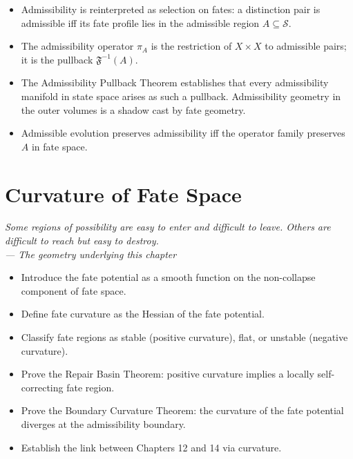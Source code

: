 \documentclass[12pt,twoside,openright]{book}
\newcommand{\distPairs}{X\times X}
\newcommand{\fateMap}{\mathfrak{F}}
\newcommand{\fateSpace}{\mathcal{S}}
\newcommand{\admRegion}{A}
\newcommand{\admOp}{\pi_{\!\admRegion}}
\newenvironment{epigraph}[2]{%
  \vspace{1em}\begin{flushright}
  \begin{minipage}{0.72\textwidth}
  \itshape\small #1\\[0.4em]
  \upshape\footnotesize\sffamily\color{DistGray}--- #2
  \end{minipage}\end{flushright}\vspace{1.5em}}{}
\newenvironment{objectives}{%
  \begin{tcolorbox}[colback=DistBlue!5,colframe=DistBlue,
    title={\faCheckCircle\enspace Chapter Objectives},
    fonttitle=\sffamily\bfseries\color{white},
    attach boxed title to top left={yshift=-2mm,xshift=4mm},
    boxed title style={colback=DistBlue},breakable]
  \begin{itemize}[leftmargin=*,nosep]}{%
  \end{itemize}\end{tcolorbox}\vspace{1em}}
\newenvironment{chapsummary}{%
  \begin{tcolorbox}[colback=DistBlue!5,colframe=DistBlue,
    title={\faBookOpen\enspace Summary},
    fonttitle=\sffamily\bfseries\color{white},
    attach boxed title to top left={yshift=-2mm,xshift=4mm},
    boxed title style={colback=DistBlue,rounded corners}]
  \begin{itemize}[nosep,leftmargin=*]}{%
  \end{itemize}\end{tcolorbox}}
\providecommand{\admRegion}{A}
\providecommand{\admOp}{\pi_{\!\admRegion}}
\begin{document}
\begin{chapsummary}
\item Admissibility is reinterpreted as selection on fates: a
  distinction pair is admissible iff its fate profile lies in
  the admissible region $\admRegion\subseteq\fateSpace$.
\item The admissibility operator $\admOp$ is the restriction of
  $\distPairs$ to admissible pairs; it is the pullback
  $\fateMap^{-1}(\admRegion)$.
\item The Admissibility Pullback Theorem establishes that every
  admissibility manifold in state space arises as such a
  pullback. Admissibility geometry in the outer volumes is a
  shadow cast by fate geometry.
\item Admissible evolution preserves admissibility iff the
  operator family preserves $\admRegion$ in fate space.
\end{chapsummary}





\chapter{Curvature of Fate Space}
\label{ch:fate-curvature}

\begin{epigraph}{Some regions of possibility are easy to enter
  and difficult to leave. Others are difficult to reach but
  easy to destroy.}{The geometry underlying this chapter}
\end{epigraph}

\begin{objectives}
\item Introduce the fate potential as a smooth function on the
  non-collapse component of fate space.
\item Define fate curvature as the Hessian of the fate potential.
\item Classify fate regions as stable (positive curvature),
  flat, or unstable (negative curvature).
\item Prove the Repair Basin Theorem: positive curvature implies
  a locally self-correcting fate region.
\item Prove the Boundary Curvature Theorem: the curvature of
  the fate potential diverges at the admissibility boundary.
\item Establish the link between Chapters 12 and 14 via curvature.
\end{objectives}
\end{document}

